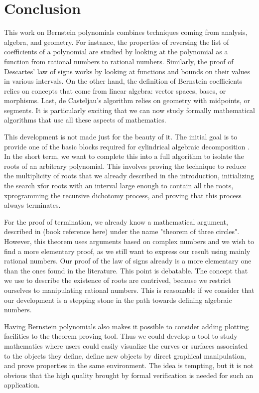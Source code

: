 \documentclass{mscs}
\begin{document}
\section{Conclusion}

This work on Bernstein polynomials combines techniques coming from
analysis, algebra, and geometry. For instance, the properties of
reversing the list of coefficients of a polynomial are studied by
looking at the polynomial as a function from rational numbers to
rational numbers. Similarly, the proof of Descartes' law of signs
works by looking at functions and bounds on their values in various
intervals. On the other hand, the definition of Bernstein coefficients
relies on concepts that come from linear algebra: vector spaces,
bases, or morphisms. Last, de Casteljau's algorithm relies on geometry
with midpoints, or segments. It is particularly exciting that we can
now study formally mathematical algorithms that use all these aspects
of mathematics.

This development is not made just for the beauty of it. The initial
goal is to provide one of the basic blocks required for cylindrical
algebraic decomposition \cite{bpr, cadcoq}. In the short term, we
want to complete this
into a full algorithm to isolate the roots of an arbitrary
polynomial. This involves proving the technique to reduce the
multiplicity of roots that we already described in the introduction,
initializing the search xfor roots with an interval large enough to
contain all the roots, xprogramming the recursive dichotomy process,
and proving that this process always terminates.

For the proof of termination, we already know a mathematical argument,
described in (book reference here) under the name "theorem of three
circles". However, this theorem uses arguments based on complex
numbers and we wish to find a more elementary proof, as we still want
to express our result using mainly rational numbers.  Our proof of the
law of signs already is a more elementary one than the ones found in
the literature. This point is debatable. The concept that we use to
describe the existence of roots are contrived, because we restrict
ourselves to manipulating rational numbers. This is reasonable if we
consider that our development is a stepping stone in the path towards
defining algebraic numbers.

Having Bernstein polynomials also makes it possible to consider adding
plotting facilities to the theorem proving tool. Thus we could develop
a tool to study mathematics where users could easily visualize the
curves or surfaces associated to the objects they define, define new
objects by direct graphical manipulation, and prove properties in the
same environment. The idea is tempting, but it is not obvious that the
high quality brought by formal verification is needed for such an
application.
\end{document}
